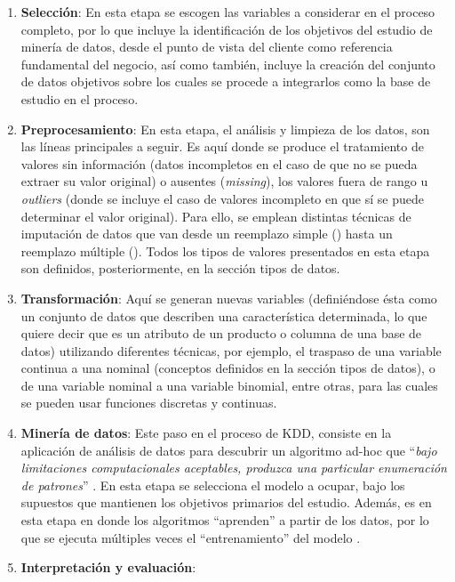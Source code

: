 \begin{enumerate}
\item \textbf{Selección}: En esta etapa se escogen las variables a considerar en el proceso completo, por lo que incluye la identiﬁcación de los objetivos del estudio de minería de datos, desde el punto de vista del cliente como referencia fundamental del negocio, así como también, incluye la creación del conjunto de datos objetivos sobre los cuales se procede a integrarlos como la base de estudio en el proceso.

\item \textbf{Preprocesamiento}: En esta etapa, el análisis y limpieza de los datos, son las líneas principales a seguir. Es aquí donde se produce el tratamiento de valores sin información (datos incompletos en el caso de que no se pueda extraer su valor original) o ausentes (\textit{missing}), los valores fuera de rango u \textit{outliers} (donde se incluye el caso de valores incompleto en que sí se puede determinar el valor original). Para ello, se emplean distintas técnicas de imputación de datos que van desde un reemplazo simple () hasta un reemplazo múltiple (). Todos los tipos de valores presentados en esta etapa son deﬁnidos, posteriormente, en la sección tipos de datos.

\item \textbf{Transformación}: Aquí se generan nuevas variables (definiéndose ésta como un conjunto de datos que describen una característica determinada, lo que quiere decir que es un atributo de un producto o columna de una base de datos) utilizando diferentes técnicas, por ejemplo, el traspaso de una variable continua a una nominal (conceptos definidos en la sección tipos de datos), o de una variable nominal a una variable binomial, entre otras, para las cuales se pueden usar funciones discretas y continuas.

\item \textbf{Minería de datos}: Este paso en el proceso de KDD, consiste en la aplicación de análisis de datos para descubrir un algoritmo ad-hoc que “\textit{bajo limitaciones computacionales aceptables, produzca una particular enumeración de patrones}” \parencite{fayyad1996data}. En esta etapa se selecciona el modelo a ocupar, bajo los supuestos que mantienen los objetivos primarios del estudio. Además, es en esta etapa en donde los algoritmos “aprenden” a partir de los datos, por lo que se ejecuta múltiples veces el “entrenamiento” del modelo \parencite{witten2016data}.

\item \textbf{Interpretación y evaluación}:

\end{enumerate}


